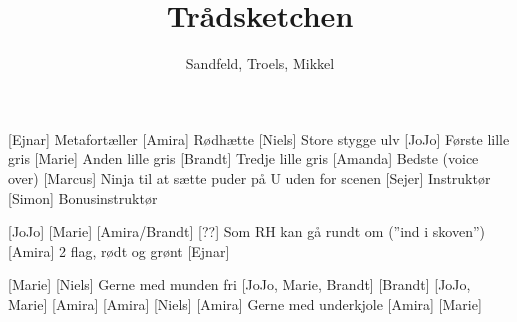 \documentclass[a4paper,11pt]{article}
\title{Trådsketchen}
\author{Sandfeld, Troels, Mikkel}
\begin{document}
\maketitle

\begin{roles}
    [Ejnar] Metafortæller
    [Amira] Rødhætte
    [Niels] Store stygge ulv
    [JoJo] Første lille gris
    [Marie] Anden lille gris
    [Brandt] Tredje lille gris
    [Amanda] Bedste (voice over)
    [Marcus] Ninja til at sætte puder på U uden for scenen
    [Sejer] Instruktør
    [Simon] Bonusinstruktør
\end{roles}

\begin{props}
    [JoJo]
    [Marie]
    [Amira/Brandt]
    [??] Som RH kan gå rundt om (''ind i skoven'')
    [Amira] 2 flag, rødt og grønt
    [Ejnar]

    [Marie]
    [Niels] Gerne med munden fri
    [JoJo, Marie, Brandt]
    [Brandt]
    [JoJo, Marie]
    [Amira]
    [Amira]
    [Niels]
    [Amira] Gerne med underkjole
    [Amira]
    [Marie]
\end{props}
\end{document}

